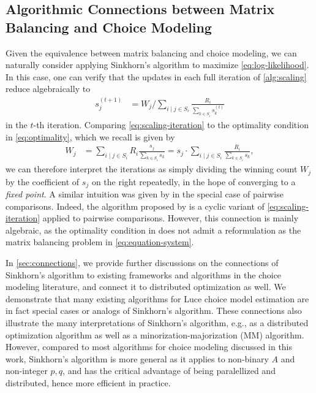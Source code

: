 \subsection{Algorithmic Connections between Matrix Balancing and Choice Modeling}
\label{subsec:IPF}
 Given the equivalence between matrix balancing and choice modeling, we can naturally consider applying Sinkhorn's algorithm to maximize \eqref{eq:log-likelihood}. In this case, one can verify that the updates in each full iteration of \cref{alg:scaling} reduce algebraically to
\begin{align}
\label{eq:scaling-iteration}
s_{j}^{(t+1)} & =W_{j}/\sum_{i\mid j\in S_{i}}\frac{R_i}{\sum_{k\in S_{i}}s_{k}^{(t)}}
\end{align}
 in the $t$-th iteration. 
 Comparing \eqref{eq:scaling-iteration} to the optimality condition in \eqref{eq:optimality}, which we recall is given by 
\begin{align*}
 W_j & =\sum_{i\mid j\in S_{i}} R_i\frac{s_{j}}{\sum_{k\in S_{i}}s_{k}}= s_{j} \cdot \sum_{i\mid j\in S_{i}}\frac{R_i}{\sum_{k\in S_{i}}s_{k}},
 \end{align*}
we can therefore interpret the iterations as simply dividing the winning count $W_j$ by the coefficient of $s_j$ on the right repeatedly, in the hope of converging to a \emph{fixed point}. A similar intuition was given by \citet{ford1957solution} in the special case of pairwise comparisons. Indeed, the algorithm proposed by \citet{ford1957solution} is a cyclic variant of \eqref{eq:scaling-iteration} applied to pairwise comparisons. However, this connection is mainly algebraic, as the optimality condition in \citet{ford1957solution} does not admit a reformulation as the matrix balancing problem in \eqref{eq:equation-system}.

In \cref{sec:connections}, we provide further discussions on the connections of Sinkhorn's algorithm to existing frameworks and algorithms in the choice modeling literature, and connect it to distributed optimization as well. We demonstrate that many existing algorithms for Luce choice model estimation are in fact special cases or analogs of Sinkhorn's algorithm. These connections also illustrate the many interpretations of Sinkhorn's algorithm, e.g., as a distributed optimization algorithm as well as a minorization-majorization (MM) algorithm. However, compared to most algorithms for choice modeling discussed in this work, Sinkhorn's algorithm is more general as it applies to non-binary $A$ and non-integer $p,q$, and has the critical advantage of being paralellized and distributed, hence more efficient in practice.

